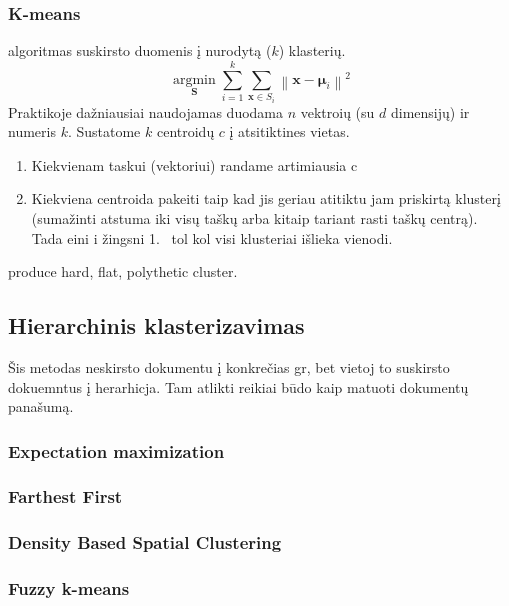 \documentclass[draft]{VUMIFInfKursinis}
\begin{document}
\subsubsection{K-means}
 algoritmas suskirsto duomenis į nurodytą ($ k $) klasterių. \[ \underset{\mathbf{S}} {\operatorname{\arg \min}}  \sum_{i=1}^{k} \sum_{\mathbf x \in S_i} \left\| \mathbf x - \boldsymbol\mu_i \right\|^2 \]
Praktikoje dažniausiai naudojamas duodama $n$ vektroių (su $d$ dimensijų) ir numeris $k$.  Sustatome $k$ centroidų $c$ į atsitiktines vietas.
\begin{enumerate}
	\item Kiekvienam taskui (vektoriui) randame artimiausia c
	\item Kiekviena centroida pakeiti taip kad jis geriau atitiktu jam priskirtą klusterį (sumažinti atstuma iki visų taškų arba kitaip tariant rasti taškų centrą). Tada eini i žingsni  1.\ %
	tol kol visi klusteriai išlieka vienodi.
\end{enumerate}
 produce hard, flat, polythetic cluster. 

\subsection{Hierarchinis klasterizavimas}
 Šis metodas neskirsto dokumentu į konkrečias gr, bet vietoj to suskirsto dokuemntus į herarhicja. Tam atlikti reikiai būdo kaip matuoti dokumentų panašumą. 


\subsubsection{Expectation maximization}
\subsubsection{Farthest First}
\subsubsection{Density Based Spatial Clustering}
\subsubsection{Fuzzy k-means}
\end{document}
